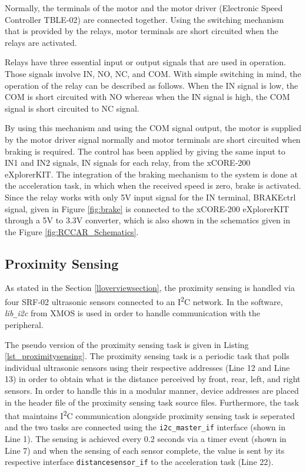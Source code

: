 Normally, the terminals of the motor and the motor driver (Electronic Speed Controller TBLE-02) are connected together. Using the switching mechanism that is provided by the relays, motor terminals are short circuited when the relays are activated. 

Relays have three essential input or output signals that are used in operation. Those signals involve IN, NO, NC, and COM. With simple switching in mind, the operation of the relay can be described as follows. When the IN signal is low, the COM is short circuited with NO whereas when the IN signal is high, the COM signal is short circuited to NC signal. 

By using this mechanism and using the COM signal output, the motor is supplied by the motor driver signal normally and motor terminals are short circuited when braking is required. The control has been applied by giving the same input to IN1 and IN2 signals, IN signals for each relay, from the xCORE-200 eXplorerKIT. The integration of the braking mechanism to the system is done at the acceleration task, in which when the received speed is zero, brake is activated. Since the relay works with only 5V input signal for the IN terminal, BRAKEctrl signal, given in Figure \ref{fig:brake} is connected to the xCORE-200 eXplorerKIT through a 5V to 3.3V converter, which is also shown in the schematics given in the Figure \ref{fig:RCCAR_Schematics}.

\subsection{Proximity Sensing}
As stated in the Section \ref{lloverviewsection}, the proximity sensing is handled via four SRF-02 ultrasonic sensors connected to an I\textsuperscript{2}C network. In the software, \textit{lib\texttt{\_}i2c} from XMOS is used in order to handle communication with the peripheral. 

The pseudo version of the proximity sensing task is given in Listing \ref{lst_proximitysensing}. The proximity sensing task is a periodic task that polls individual ultrasonic sensors using their respective addresses (Line 12 and Line 13) in order to obtain what is the distance perceived by front, rear, left, and right sensors. In order to handle this in a modular manner, device addresses are placed in the header file of the proximity sensing task source files. Furthermore, the task that maintains I\textsuperscript{2}C communication alongside proximity sensing task is seperated and the two tasks are connected using the \texttt{i2c\texttt{\_}master\texttt{\_}if} interface (shown in Line 1). The sensing is achieved every 0.2 seconds via a timer event (shown in Line 7) and when the sensing of each sensor complete, the value is sent by its respective interface \texttt{distancesensor\texttt{\_}if} to the acceleration task (Line 22). 

